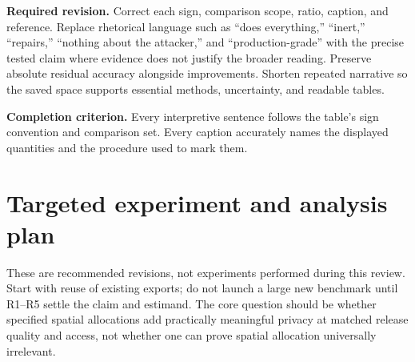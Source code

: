 \documentclass[11pt,a4paper]{article}
\newcommand{\action}{\par\textbf{Required revision.} }
\newcommand{\acceptance}{\par\textbf{Completion criterion.} }
\begin{document}
\action
Correct each sign, comparison scope, ratio, caption, and reference. Replace rhetorical language such as ``does everything,'' ``inert,'' ``repairs,'' ``nothing about the attacker,'' and ``production-grade'' with the precise tested claim where evidence does not justify the broader reading. Preserve absolute residual accuracy alongside improvements. Shorten repeated narrative so the saved space supports essential methods, uncertainty, and readable tables.
\acceptance
Every interpretive sentence follows the table's sign convention and comparison set. Every caption accurately names the displayed quantities and the procedure used to mark them.

\section{Targeted experiment and analysis plan}

These are recommended revisions, not experiments performed during this review. Start with reuse of existing exports; do not launch a large new benchmark until R1--R5 settle the claim and estimand. The core question should be whether specified spatial allocations add practically meaningful privacy at matched release quality and access, not whether one can prove spatial allocation universally irrelevant.
\end{document}
